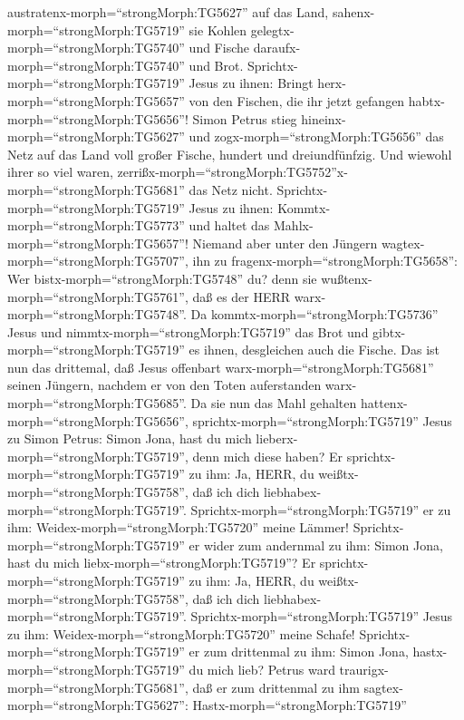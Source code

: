 austratenx-morph=``strongMorph:TG5627'' auf das Land,
sahenx-morph=``strongMorph:TG5719'' sie Kohlen
gelegtx-morph=``strongMorph:TG5740'' und Fische
daraufx-morph=``strongMorph:TG5740'' und Brot. 
Sprichtx-morph=``strongMorph:TG5719'' Jesus zu ihnen: Bringt
herx-morph=``strongMorph:TG5657'' von den Fischen, die ihr jetzt
gefangen habtx-morph=``strongMorph:TG5656''!  Simon Petrus
stieg hineinx-morph=``strongMorph:TG5627'' und
zogx-morph=``strongMorph:TG5656'' das Netz auf das Land voll großer
Fische, hundert und dreiundfünfzig. Und wiewohl ihrer so viel waren,
zerrißx-morph=``strongMorph:TG5752''x-morph=``strongMorph:TG5681'' das
Netz nicht.  Sprichtx-morph=``strongMorph:TG5719'' Jesus zu
ihnen: Kommtx-morph=``strongMorph:TG5773'' und haltet das
Mahlx-morph=``strongMorph:TG5657''! Niemand aber unter den Jüngern
wagtex-morph=``strongMorph:TG5707'', ihn zu
fragenx-morph=``strongMorph:TG5658'': Wer
bistx-morph=``strongMorph:TG5748'' du? denn sie
wußtenx-morph=``strongMorph:TG5761'', daß es der HERR
warx-morph=``strongMorph:TG5748''.  Da
kommtx-morph=``strongMorph:TG5736'' Jesus und
nimmtx-morph=``strongMorph:TG5719'' das Brot und
gibtx-morph=``strongMorph:TG5719'' es ihnen, desgleichen auch die
Fische.  Das ist nun das drittemal, daß Jesus offenbart
warx-morph=``strongMorph:TG5681'' seinen Jüngern, nachdem er von den
Toten auferstanden warx-morph=``strongMorph:TG5685''.  Da
sie nun das Mahl gehalten hattenx-morph=``strongMorph:TG5656'',
sprichtx-morph=``strongMorph:TG5719'' Jesus zu Simon Petrus: Simon Jona,
hast du mich lieberx-morph=``strongMorph:TG5719'', denn mich diese
haben? Er sprichtx-morph=``strongMorph:TG5719'' zu ihm: Ja, HERR, du
weißtx-morph=``strongMorph:TG5758'', daß ich dich
liebhabex-morph=``strongMorph:TG5719''.
Sprichtx-morph=``strongMorph:TG5719'' er zu ihm:
Weidex-morph=``strongMorph:TG5720'' meine Lämmer! 
Sprichtx-morph=``strongMorph:TG5719'' er wider zum andernmal zu ihm:
Simon Jona, hast du mich liebx-morph=``strongMorph:TG5719''? Er
sprichtx-morph=``strongMorph:TG5719'' zu ihm: Ja, HERR, du
weißtx-morph=``strongMorph:TG5758'', daß ich dich
liebhabex-morph=``strongMorph:TG5719''.
Sprichtx-morph=``strongMorph:TG5719'' Jesus zu ihm:
Weidex-morph=``strongMorph:TG5720'' meine Schafe! 
Sprichtx-morph=``strongMorph:TG5719'' er zum drittenmal zu ihm: Simon
Jona, hastx-morph=``strongMorph:TG5719'' du mich lieb? Petrus ward
traurigx-morph=``strongMorph:TG5681'', daß er zum drittenmal zu ihm
sagtex-morph=``strongMorph:TG5627'': Hastx-morph=``strongMorph:TG5719''
